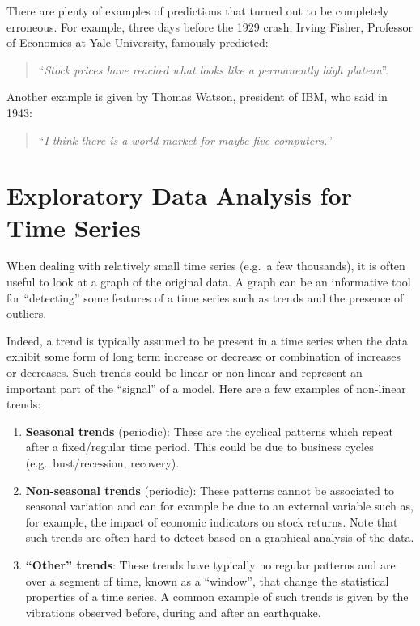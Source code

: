 \documentclass[]{book}
\theoremstyle{definition}
\theoremstyle{definition}
\theoremstyle{definition}
\theoremstyle{remark}
\begin{document}
There are plenty of examples of predictions that turned out to be
completely erroneous. For example, three days before the 1929 crash,
Irving Fisher, Professor of Economics at Yale University, famously
predicted:

\begin{quote}
``\emph{Stock prices have reached what looks like a permanently high
plateau}''.
\end{quote}

Another example is given by Thomas Watson, president of IBM, who said in
1943:

\begin{quote}
``\emph{I think there is a world market for maybe five computers.}''
\end{quote}

\hypertarget{eda}{%
\section{Exploratory Data Analysis for Time Series}\label{eda}}

When dealing with relatively small time series (e.g.~a few thousands),
it is often useful to look at a graph of the original data. A graph can
be an informative tool for ``detecting'' some features of a time series
such as trends and the presence of outliers.

Indeed, a trend is typically assumed to be present in a time series when
the data exhibit some form of long term increase or decrease or
combination of increases or decreases. Such trends could be linear or
non-linear and represent an important part of the ``signal'' of a model.
Here are a few examples of non-linear trends:

\begin{enumerate}
\def\labelenumi{\arabic{enumi}.}
\item
  \textbf{Seasonal trends} (periodic): These are the cyclical patterns
  which repeat after a fixed/regular time period. This could be due to
  business cycles (e.g.~bust/recession, recovery).
\item
  \textbf{Non-seasonal trends} (periodic): These patterns cannot be
  associated to seasonal variation and can for example be due to an
  external variable such as, for example, the impact of economic
  indicators on stock returns. Note that such trends are often hard to
  detect based on a graphical analysis of the data.
\item
  \textbf{``Other'' trends}: These trends have typically no regular
  patterns and are over a segment of time, known as a ``window'', that
  change the statistical properties of a time series. A common example
  of such trends is given by the vibrations observed before, during and
  after an earthquake.
\end{enumerate}
\end{document}
